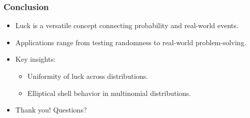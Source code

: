 \documentclass{beamer}
\begin{document}
\begin{frame}
\frametitle{Conclusion}
\begin{itemize}
    \item Luck is a versatile concept connecting probability and real-world events.
    \item Applications range from testing randomness to real-world problem-solving.
    \item Key insights:
        \begin{itemize}
            \item Uniformity of luck across distributions.
            \item Elliptical shell behavior in multinomial distributions.
        \end{itemize}
    \item Thank you! Questions?
\end{itemize}
\end{frame}
\end{document}
